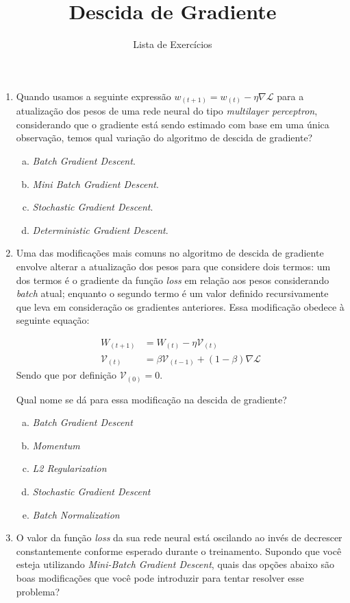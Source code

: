 \documentclass{dlproblemset}
\title{Descida de Gradiente}
\subtitle{Lista de Exercícios}
\begin{document}
\begin{enumerate}[1)]

    \item Quando usamos a seguinte expressão $w_{(t+1)} = w_{(t)} - \eta \nabla \mathcal{L}$ para a atualização dos pesos de uma rede neural do tipo \textit{multilayer perceptron}, considerando que o gradiente está sendo estimado com base em uma única observação, temos qual variação do algoritmo de descida de gradiente?
    \begin{enumerate}[(a)]
	    \item \textit{Batch Gradient Descent}.
	    \item \textit{Mini Batch Gradient Descent}.
	    \item \textit{Stochastic Gradient Descent}.
	    \item \textit{Deterministic Gradient Descent}.
    \end{enumerate}

    \item Uma das modificações mais comuns no algoritmo de descida de gradiente envolve alterar a atualização dos pesos para que considere dois termos: um dos termos é o gradiente da função \textit{loss} em relação aos pesos considerando \textit{batch} atual; enquanto o segundo termo é um valor definido recursivamente que leva em consideração os gradientes anteriores. Essa modificação obedece à seguinte equação:

    \begin{align*}
        W_{(t+1)} &= W_{(t)} - \eta \mathcal{V}_{(t)} \\
        \mathcal{V}_{(t)} &= \beta \mathcal{V}_{(t-1)} + (1-\beta)\nabla \mathcal{L}
    \end{align*}
    \noindent Sendo que por definição $\mathcal{V}_{(0)} = 0$.

    Qual nome se dá para essa modificação na descida de gradiente?
    \begin{enumerate}[(a)]
        \item \textit{Batch Gradient Descent}
        \item \textit{Momentum}
        \item \textit{L2 Regularization}
        \item \textit{Stochastic Gradient Descent}
        \item \textit{Batch Normalization}
    \end{enumerate}

    \item O valor da função \textit{loss} da sua rede neural está oscilando ao invés de decrescer constantemente conforme esperado durante o treinamento. Supondo que você esteja utilizando \textit{Mini-Batch Gradient Descent}, quais das opções abaixo são boas modificações que você pode introduzir para tentar resolver esse problema?


\end{enumerate}
\end{document}
